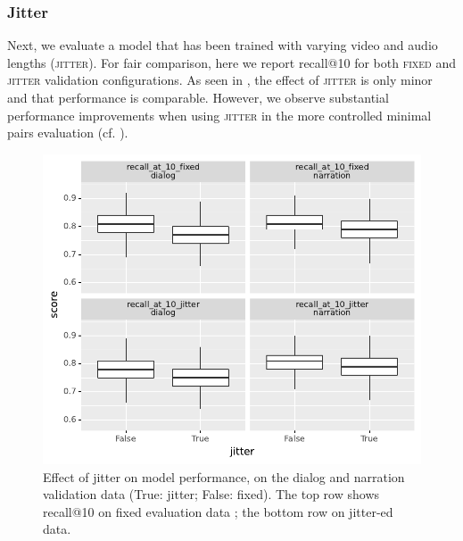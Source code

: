 \subsubsection{Jitter}
Next, we evaluate a model that has been trained with varying video and audio 
lengths (\textsc{jitter}). For fair comparison, here we report recall@10 for both 
\textsc{fixed} and \textsc{jitter} validation configurations.
As seen in , the effect of \textsc{jitter} is only
minor and that performance is comparable.
However, we observe 
substantial performance improvements when using \textsc{jitter} in the more 
controlled minimal pairs evaluation (cf. ).
\begin{figure}[htb]
	\centering
	\includegraphics[width=\columnwidth]{results/ablations/jitter.pdf}
	\caption{Effect of jitter on model performance, on the dialog
          and narration validation data (True: jitter; False:
          fixed). The top row shows recall@10 on {\sc fixed}
          evaluation data ; the bottom row on {\sc jitter}-ed data.}
	\label{fig:jitter}
\end{figure}



